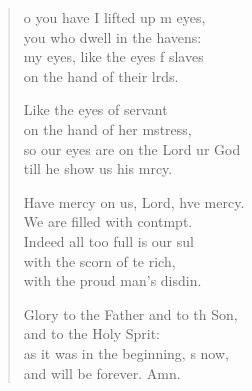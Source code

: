 \begin{verse}
  \begin{patverse}
o you have I lifted up m eyes,\Med\\
you who dwell in the havens:\\
my eyes, like the eyes f slaves\Med\\
on the hand of their lrds.

Like the eyes of  servant\Med\\
on the hand of her m\pointup{\i}stress,\\
so our eyes are on the Lord ur God\Med\\
till he show us his mrcy.

Have mercy on us, Lord, hve mercy.\Med\\
We are filled with contmpt.\\
Indeed all too full is our sul\Flex\\
with the scorn of te rich,\Med\\
with the proud man’s disdin.

Glory to the Father and to th Son,\Med\\
and to the Holy Sp\pointup{\i}rit:\\
as it was in the beginning, \pointup{\i}s now,\Med\\
and will be forever. Amn. 
  \end{patverse}
\end{verse}
